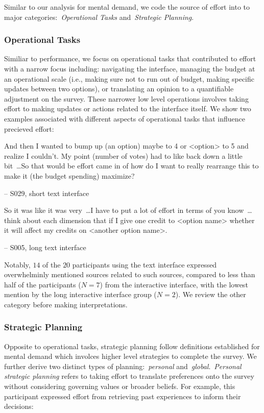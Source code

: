 Similar to our analysis for mental demand, we code the source of effort into to major categories:~\textit{Operational Tasks} and~\textit{Strategic Planning}.

\subsubsection{Operational Tasks} Similiar to performance, we focus on operational tasks that contributed to effort with a narrow focus including: navigating the interface, managing the budget at an operational scale (i.e., making sure not to run out of budget, making specific updates between two options), or translating an opinion to a quantifiable adjustment on the survey. These narrower low level operations involves taking effort to making updates or actions related to the interface itself. We show two examples associated with different aspects of operational tasks that influence precieved effort:

\begin{displayquote}
And then I wanted to bump up (an option) maybe to 4 or <option> to 5 and realize I couldn't. My point (number of votes) had to like back down a little bit~\ldots So that would be effort came in of how do I want to really rearrange this to make it (the budget spending) maximize?

\noindent \hfill -- S029, short text interface
\end{displayquote}

\begin{displayquote}
So it was like it was very~\ldots I have to put a lot of effort in terms of you know~\ldots think about each dimension that if I give one credit to <option name> whether it will affect my credits on <another option name>.

\noindent \hfill -- S005, long text interface
\end{displayquote}

Notably, $14$ of the $20$ participants using the text interface expressed overwhelminly mentioned sources related to such sources, compared to less than half of the participants ($N=7$) from the interactive interface, with the lowest mention by the long interactive interface group ($N=2$). We review the other category before making interpretations.

\subsubsection{Strategic Planning} Opposite to operational tasks, strategic planning follow definitions established for mental demand which involces higher level strategies to complete the survey. We further derive two distinct types of planning:~\textit{personal} and~\textit{global}.~\textit{Personal strategic planning} refers to taking effort to translate preferences onto the survey without considering governing values or broader beliefs. For example, this participant expressed effort from retrieving past experiences to inform their decisions:

